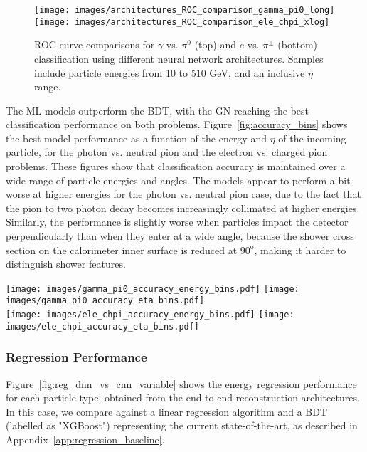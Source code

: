 \begin{figure}[htbp]
\centering
\texttt{[image: images/architectures\_ROC\_comparison\_gamma\_pi0\_long]}
\texttt{[image: images/architectures\_ROC\_comparison\_ele\_chpi\_xlog]}
\caption{ROC curve comparisons for $\gamma$ vs. $\pi^0$ (top) and $e$ vs. $\pi^\pm$ (bottom) classification using different neural network architectures. Samples include particle energies from 10 to 510 GeV, and an inclusive $\eta$ range.}
\label{fig:architectures_ROC_comparisons}
\end{figure}

The ML models outperform the BDT, with the GN reaching the best classification performance on both problems. Figure~\ref{fig:accuracy_bins} shows the best-model performance as a function of the energy and $\eta$ of the incoming particle, for the photon vs. neutral pion and the electron vs. charged pion problems. These figures show that classification accuracy is maintained over a wide range of particle energies and angles. The models appear to perform a bit worse at higher energies for the photon vs. neutral pion case, due to the fact that the pion to two photon decay becomes increasingly collimated at higher energies. Similarly, the performance is slightly worse when particles impact the detector perpendicularly than when they enter at a wide angle, because the shower cross section on the calorimeter inner surface is reduced at $90^{\mathrm o}$, making it harder to distinguish shower features.

\begin{figure*}[htbp]
\centering
\texttt{[image: images/gamma\_pi0\_accuracy\_energy\_bins.pdf]}
\texttt{[image: images/gamma\_pi0\_accuracy\_eta\_bins.pdf]} \\
\texttt{[image: images/ele\_chpi\_accuracy\_energy\_bins.pdf]}
\texttt{[image: images/ele\_chpi\_accuracy\_eta\_bins.pdf]}
\caption{Classification accuracy of best performing network for $\gamma$ vs. $\pi^0$ (top) and $e$ vs. $\pi^\pm$ (bottom), in bins of energy (left) and $\eta$ (right).}
\label{fig:accuracy_bins}
\end{figure*}


\subsubsection{Regression Performance}
\label{sec:regression}

Figure~\ref{fig:reg_dnn_vs_cnn_variable} shows the energy regression performance for each particle type, obtained from the end-to-end reconstruction architectures. In this case, we compare against a linear regression algorithm and a BDT (labelled as "XGBoost") representing the current state-of-the-art, as described in Appendix~\ref{app:regression_baseline}. 

